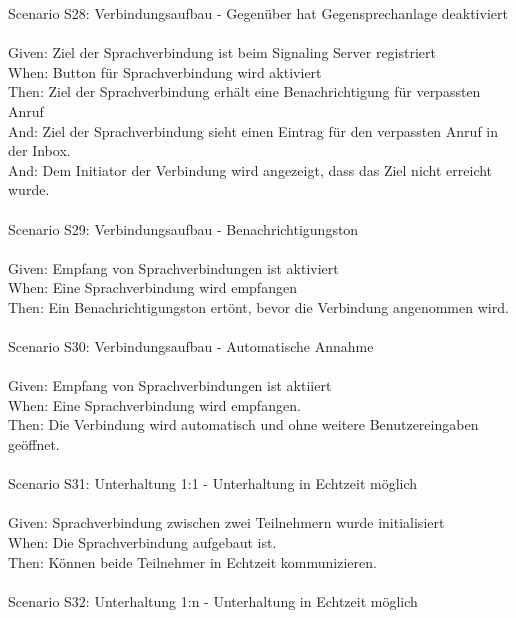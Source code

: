 \begin{tabbing}
    Scenario S28: \> \> \> Verbindungsaufbau - Gegenüber hat Gegensprechanlage deaktiviert \\ \\
    Given:  \> \> \> Ziel der Sprachverbindung ist beim Signaling Server registriert\\
    When:   \> \> \> Button für Sprachverbindung wird aktiviert\\
    Then:   \> \> \> Ziel der Sprachverbindung erhält eine Benachrichtigung für verpassten Anruf\\
    And:   \> \> \> Ziel der Sprachverbindung sieht einen Eintrag für den verpassten Anruf in der Inbox.\\
    And:   \> \> \> Dem Initiator der Verbindung wird angezeigt, dass das Ziel nicht erreicht wurde. \\
    \\
    Scenario S29: \> \> \> Verbindungsaufbau - Benachrichtigungston \\ \\
    Given:  \> \> \> Empfang von Sprachverbindungen ist aktiviert\\
    When:   \> \> \> Eine Sprachverbindung wird empfangen\\
    Then:   \> \> \> Ein Benachrichtigungston ertönt, bevor die Verbindung angenommen wird.\\
    \\
    Scenario S30: \> \> \> Verbindungsaufbau - Automatische Annahme \\ \\
    Given:  \> \> \> Empfang von Sprachverbindungen ist aktiiert\\
    When:   \> \> \> Eine Sprachverbindung wird empfangen.\\
    Then:   \> \> \> Die Verbindung wird automatisch und ohne weitere Benutzereingaben geöffnet. \\
    \\
    Scenario S31: \> \> \> Unterhaltung 1:1 - Unterhaltung in Echtzeit möglich \\ \\
    Given:  \> \> \> Sprachverbindung zwischen zwei Teilnehmern wurde initialisiert\\
    When:   \> \> \> Die Sprachverbindung aufgebaut ist. \\
    Then:   \> \> \> Können beide Teilnehmer in Echtzeit kommunizieren.\\
    \\
    Scenario S32: \> \> \> Unterhaltung 1:n - Unterhaltung in Echtzeit möglich \\ \\

\end{tabbing}
